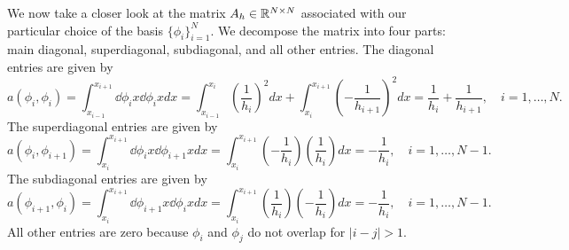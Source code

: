 
We now take a closer look at the matrix $A_h \in \mathbb{R}^{N \times N}$ associated with our particular choice of the basis $\{\phi_i\}_{i=1}^N$.  We decompose the matrix into four parts: main diagonal, superdiagonal, subdiagonal, and all other entries.  The diagonal entries are given by 
\begin{equation*}
  a(\phi_i,\phi_i) = \int_{x_{i-1}}^{x_{i+1}} \dd{\phi_i}{x} \dd{\phi_i}{x} dx
  = \int_{x_{i-1}}^{x_{i}} \left( \frac{1}{h_i} \right)^2 dx +
  \int_{x_{i}}^{x_{i+1}} \left( - \frac{1}{h_{i+1}} \right)^2 dx
  = \frac{1}{h_i} + \frac{1}{h_{i+1}}, \quad i = 1,\dots,N.
\end{equation*}
The superdiagonal entries are given by
\begin{equation*}
  a(\phi_i,\phi_{i+1}) =
  \int_{x_i}^{x_{i+1}} \dd{\phi_i}{x} \dd{\phi_{i+1}}{x} dx
  = \int_{x_i}^{x_{i+1}} \left( - \frac{1}{h_i} \right) \left( \frac{1}{h_i} \right) dx
  = - \frac{1}{h_i}, \quad i = 1,\dots,N-1.
\end{equation*}
The subdiagonal entries are given by
\begin{equation*}
  a(\phi_{i+1},\phi_i) =
  \int_{x_i}^{x_{i+1}} \dd{\phi_{i+1}}{x} \dd{\phi_i}{x} dx
  = \int_{x_i}^{x_{i+1}}  \left( \frac{1}{h_i} \right) \left( - \frac{1}{h_i} \right) dx
  = - \frac{1}{h_i}, \quad i = 1,\dots,N-1.
\end{equation*}
All other entries are zero because $\phi_i$ and $\phi_j$ do not overlap for $|i -j| > 1$.

